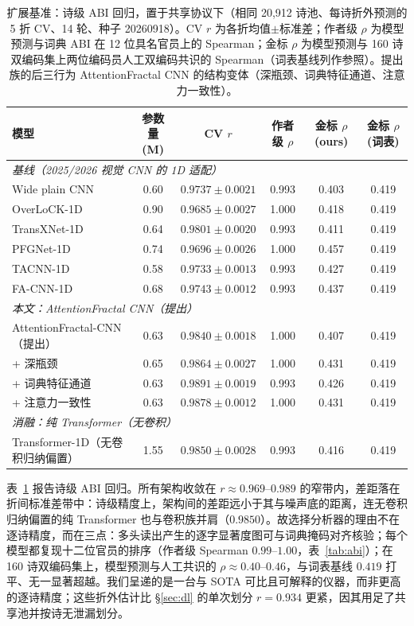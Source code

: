 \documentclass[11pt]{article}
\begin{document}
\begin{table}[H]
\centering\small
\caption{扩展基准：诗级 ABI 回归，置于共享协议下（相同 20,912 诗池、每诗折外预测的 5 折 CV、14 轮、种子 20260918）。CV $r$ 为各折均值$\pm$标准差；作者级 $\rho$ 为模型预测与词典 ABI 在 12 位具名官员上的 Spearman；金标 $\rho$ 为模型预测与 160 诗双编码集上两位编码员人工双编码共识的 Spearman（词表基线列作参照）。提出族的后三行为 AttentionFractal CNN 的结构变体（深瓶颈、词典特征通道、注意力一致性）。}
\label{tab:extbench}
\begin{tabular}{lccccc}
\toprule
模型 & 参数量(M) & CV $r$ & 作者级 $\rho$ & 金标 $\rho$(ours) & 金标 $\rho$(词表)\\
\midrule
\multicolumn{6}{l}{\emph{基线（2025/2026 视觉 CNN 的 1D 适配）}}\\
Wide plain CNN & 0.60 & $0.9737{\pm}0.0021$ & 0.993 & 0.403 & 0.419\\
OverLoCK-1D \citep{overlock2025} & 0.90 & $0.9685{\pm}0.0027$ & 1.000 & 0.418 & 0.419\\
TransXNet-1D \citep{transxnet2025} & 0.64 & $0.9801{\pm}0.0020$ & 0.993 & 0.411 & 0.419\\
PFGNet-1D \citep{pfgn2026} & 0.74 & $0.9696{\pm}0.0026$ & 1.000 & 0.457 & 0.419\\
TACNN-1D \citep{tacnn2026} & 0.58 & $0.9733{\pm}0.0013$ & 0.993 & 0.427 & 0.419\\
FA-CNN-1D \citep{facnn2026} & 0.68 & $0.9743{\pm}0.0012$ & 0.993 & 0.437 & 0.419\\
\multicolumn{6}{l}{\emph{本文：AttentionFractal CNN（提出）}}\\
AttentionFractal-CNN（提出） & 0.63 & $0.9840{\pm}0.0018$ & 1.000 & 0.407 & 0.419\\
\quad + 深瓶颈 & 0.65 & $0.9864{\pm}0.0027$ & 1.000 & 0.431 & 0.419\\
\quad + 词典特征通道 & 0.63 & $0.9891{\pm}0.0019$ & 0.993 & 0.426 & 0.419\\
\quad + 注意力一致性 & 0.63 & $0.9878{\pm}0.0012$ & 1.000 & 0.431 & 0.419\\
\multicolumn{6}{l}{\emph{消融：纯 Transformer（无卷积）}}\\
Transformer-1D（无卷积归纳偏置） & 1.55 & $0.9850{\pm}0.0028$ & 0.993 & 0.416 & 0.419\\
\bottomrule
\end{tabular}
\end{table}

表~\ref{tab:extbench} 报告诗级 ABI 回归。所有架构收敛在 $r\approx0.969$–$0.989$ 的窄带内，差距落在折间标准差带中：诗级精度上，架构间的差距远小于其与噪声底的距离，连无卷积归纳偏置的纯 Transformer 也与卷积族并肩（$0.9850$）。故选择分析器的理由不在逐诗精度，而在三点：多头读出产生的逐字显著度图可与词典掩码对齐核验；每个模型都复现十二位官员的排序（作者级 Spearman $0.99$–$1.00$，表~\ref{tab:abi}）；在 160 诗双编码集上，模型预测与人工共识的 $\rho\approx0.40$–$0.46$，与词表基线 $0.419$ 打平、无一显著超越。我们呈递的是一台与 SOTA 可比且可解释的仪器，而非更高的逐诗精度；这些折外估计比 \S\ref{sec:dl} 的单次划分 $r{=}0.934$ 更紧，因其用足了共享池并按诗无泄漏划分。
\end{document}
